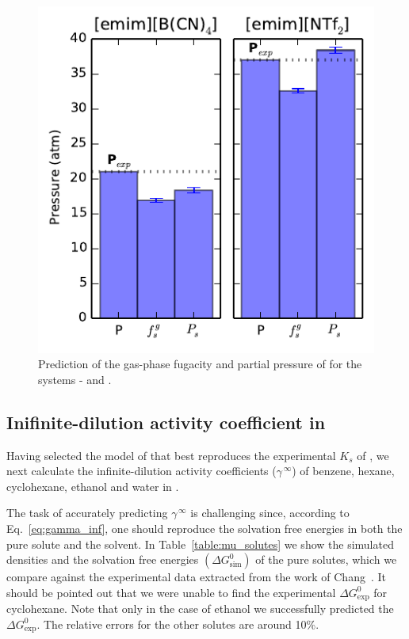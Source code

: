 \documentclass[3p,twocolumn]{elsarticle}
\begin{document}
\begin{figure}[ht]
\includegraphics[width=\linewidth]{pressure_est.pdf}
\caption{Prediction of the gas-phase fugacity and partial pressure of  for the systems -\ce{[emim][B(CN)_4]} and \ce{[emim][NTf_2]}.}
\label{fig:pressure}
\end{figure}

\subsection{Inifinite-dilution activity coefficient in \ce{[emim][B(CN)_4]}}
\label{sec:act_results}

Having selected the model of \ce{[emim][B(CN)_4]} that best reproduces the experimental $K_s$ of , we next calculate the infinite-dilution activity coefficients ($\gamma^{\, \infty}$) of benzene, hexane, cyclohexane, ethanol and water in \ce{[emim][B(CN)_4]}.

The task of accurately predicting $\gamma^{\, \infty}$ is challenging since, according to Eq.~\eqref{eq:gamma_inf}, one should reproduce the solvation free energies in both the pure solute and the solvent.
In Table~\ref{table:mu_solutes} we show the simulated densities and the solvation free energies $(\Delta G^{0}_\text{sim})$ of the pure solutes, which we compare against the experimental data extracted from the work of Chang~\cite{Chang_2009}.
It should be pointed out that we were unable to find the experimental $\Delta G^{0}_\text{exp}$ for cyclohexane.
Note that only in the case of ethanol we successfully predicted the $\Delta G^{0}_\text{exp}$.
The relative errors for the other solutes are around 10\%.
\end{document}
